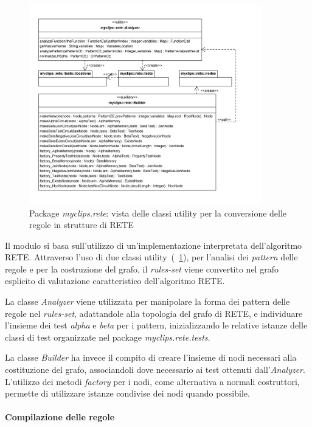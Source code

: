 \begin{figure}
\centering
\includegraphics[width=0.9\textwidth]{Immagini/Capitolo3/Classi/myclips_rete_Builders.png}
\caption{Package \emph{myclips.rete}: vista delle classi utility per la conversione delle regole in strutture di RETE}\label{fig:class-myclips-rete-builders}
\end{figure}

Il modulo si basa sull'utilizzo di un'implementazione interpretata dell'algoritmo RETE. Attraverso l'uso di due classi utility~(\figurename~\ref{fig:class-myclips-rete-builders}), per l'analisi dei \emph{pattern} delle regole e per la costruzione del grafo, il \emph{rules-set} viene convertito nel grafo esplicito di valutazione caratteristico dell'algoritmo RETE.

La classe \emph{Analyzer} viene utilizzata per manipolare la forma dei pattern delle regole nel \emph{rules-set}, adattandole alla topologia del grafo di RETE, e individuare l'insieme dei test \emph{alpha} e \emph{beta} per i pattern, inizializzando le relative istanze delle classi di test organizzate nel package \emph{myclips.rete.tests}.

La classe \emph{Builder} ha invece il compito di creare l'insieme di nodi necessari alla costituzione del grafo, associandoli dove necessario ai test ottenuti dall'\emph{Analyzer}.
L'utilizzo dei metodi \emph{factory} per i nodi, come alternativa a normali costruttori, permette di utilizzare istanze condivise dei nodi quando possibile.

\paragraph{Compilazione delle regole}

